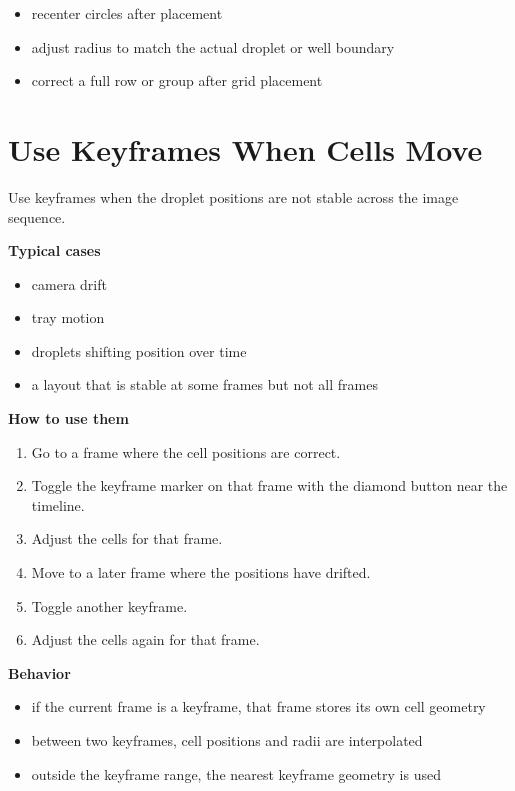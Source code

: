 \documentclass[
  9pt,
  letterpaper,
  oneside,
  open=any,
  DIV=15,
  parskip=half-,
  headings=big,
  numbers=noenddot
]{scrbook}
\newcommand{\manuallead}[1]{%
  \vspace{0.15em}%
  {\sffamily\bfseries\color{ManualBlue}#1}\par\nobreak\vspace{0.05em}%
}
\begin{document}
\begin{itemize}[leftmargin=*,itemsep=0.35em,topsep=0.4em]
\item recenter circles after placement
\item adjust radius to match the actual droplet or well boundary
\item correct a full row or group after grid placement
\end{itemize}

\section{Use Keyframes When Cells Move}

Use keyframes when the droplet positions are not stable across the image sequence.


\manuallead{Typical cases}

\begin{itemize}[leftmargin=*,itemsep=0.35em,topsep=0.4em]
\item camera drift
\item tray motion
\item droplets shifting position over time
\item a layout that is stable at some frames but not all frames
\end{itemize}

\manuallead{How to use them}

\begin{enumerate}[leftmargin=*,itemsep=0.35em,topsep=0.4em]
\item Go to a frame where the cell positions are correct.
\item Toggle the keyframe marker on that frame with the diamond button near the timeline.
\item Adjust the cells for that frame.
\item Move to a later frame where the positions have drifted.
\item Toggle another keyframe.
\item Adjust the cells again for that frame.
\end{enumerate}

\manuallead{Behavior}

\begin{itemize}[leftmargin=*,itemsep=0.35em,topsep=0.4em]
\item if the current frame is a keyframe, that frame stores its own cell geometry
\item between two keyframes, cell positions and radii are interpolated
\item outside the keyframe range, the nearest keyframe geometry is used
\end{itemize}
\end{document}
